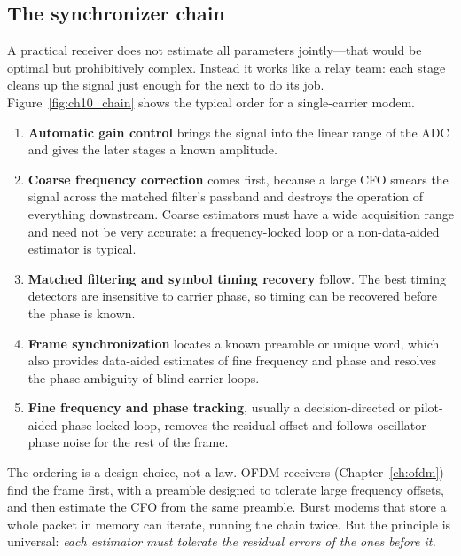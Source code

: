 \subsection{The synchronizer chain}

A practical receiver does not estimate all parameters jointly---that would be optimal but
prohibitively complex. Instead it works like a relay team: each stage cleans up the signal just
enough for the next to do its job. Figure~\ref{fig:ch10_chain} shows the typical order for a
single-carrier modem.
\begin{enumerate}
\item \textbf{Automatic gain control} brings the signal into the linear range of the ADC and gives
the later stages a known amplitude.
\item \textbf{Coarse frequency correction} comes first, because a large CFO smears the signal
across the matched filter's passband and destroys the operation of everything downstream. Coarse
estimators must have a wide acquisition range and need not be very accurate: a
frequency-locked loop or a non-data-aided estimator is typical.
\item \textbf{Matched filtering and symbol timing recovery} follow. The best timing detectors are
insensitive to carrier phase, so timing can be recovered before the phase is known.
\item \textbf{Frame synchronization} locates a known preamble or unique word, which also provides
data-aided estimates of fine frequency and phase and resolves the phase ambiguity of blind
carrier loops.
\item \textbf{Fine frequency and phase tracking}, usually a decision-directed or pilot-aided
phase-locked loop, removes the residual offset and follows oscillator phase noise for the rest of
the frame.
\end{enumerate}
The ordering is a design choice, not a law. OFDM receivers (Chapter~\ref{ch:ofdm}) find the frame
first, with a preamble designed to tolerate large frequency offsets, and then estimate the CFO from
the same preamble. Burst modems that store a whole packet in memory can iterate, running the chain
twice. But the principle is universal: \emph{each estimator must tolerate the residual errors of
the ones before it.}

